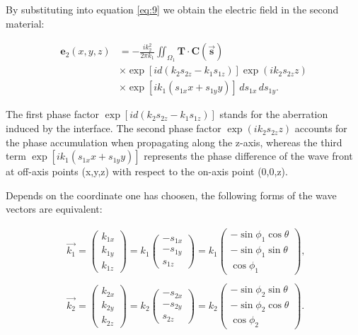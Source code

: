 \documentclass[9pt,twocolumn,twoside]{osajnl}
\begin{document}
By substituting into equation \eqref{eq:9} we obtain the electric field in the second material:

\begin{equation}
	\begin{aligned}\label{eq:12}
	\mathbf{e}_2(x,y,z)&=-\frac{ik^2_2}{2\pi k_1}\iint_{\Omega_1}\mathbf{T}\cdot\mathbf{C}(\vec{\mathbf{s}})\\
	&\times\exp[id(k_2s_{2z}-k_1s_{1z})]\exp(ik_2s_{2z}z)\\
	&\times\exp[ik_1(s_{1x}x+s_{1y}y)]\,ds_{1x}\,ds_{1y}.
	\end{aligned}
\end{equation}

The first phase factor $\exp[id(k_2s_{2z}-k_1s_{1z})]$ stands for the aberration induced by the interface. The second phase factor $\exp(ik_2s_{2z}z)$ accounts for the phase accumulation when propagating along the z-axis, whereas the third term $\exp[ik_1(s_{1x}x+s_{1y}y)]$ represents the phase difference of the wave front at off-axis points (x,y,z) with respect to the on-axis point (0,0,z).

Depends on the coordinate one has choosen, the following forms of the wave vectors are equivalent:

\begin{equation}\label{eq:13}
	\begin{aligned}
		&\vec{k_1}=\begin{pmatrix}
			k_{1x}\\
			k_{1y}\\
			k_{1z}
		\end{pmatrix}=k_1	
		\begin{pmatrix}
			-s_{1x}\\
			-s_{1y}\\
			s_{1z}	
		\end{pmatrix}=k_1
		\begin{pmatrix}
			-\sin\phi_1\cos\theta\\
			-\sin\phi_1\sin\theta\\
			\cos\phi_1	
		\end{pmatrix},\,\,\\\\
	&\vec{k_2}=\begin{pmatrix}
		k_{2x}\\
		k_{2y}\\
		k_{2z}
	\end{pmatrix}=k_2	
		\begin{pmatrix}
			-s_{2x}\\
			-s_{2y}\\
			s_{2z}	
		\end{pmatrix}=k_2
		\begin{pmatrix}
			-\sin\phi_2\sin\theta\\
			-\sin\phi_2\cos\theta\\
			\cos\phi_2	
		\end{pmatrix}.		
	\end{aligned}
\end{equation}
\end{document}
